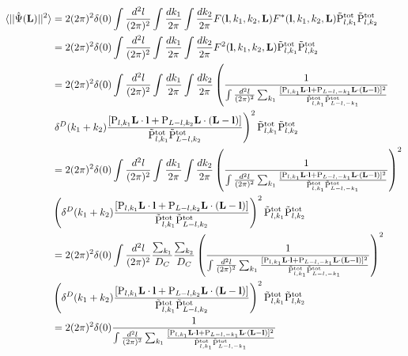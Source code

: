 \documentclass[12pt]{article}
\newcommand{\beq}{\begin{equation}}
\newcommand{\eeq}{\end{equation}}
\newcommand{\beqal}{\begin{aligned}}
\newcommand{\eeqal}{\end{aligned}}
\def\l{{\bf l}}
\def\L{{\bf L}}
\def\pul{{\rm P}}
\def\ptot{{\tilde{\rm P}^{\rm tot}}}
\def\d2l{\frac{d^2l}{(2\pi)^2}}
\def\dko{\frac{dk_1}{2\pi}}
\def\dkt{\frac{dk_2}{2\pi}}
\numberwithin{equation}{section}
\begin{document}
\beq
\beqal
\langle ||\hat{\Psi}(\L)||^2\rangle &= 2 (2\pi)^2 \delta(0) \int \d2l \int \dko \int
\dkt F(\l,k_1,k_2,\L) F^*(\l,k_1,k_2,\L) \ptot_{l,k_1}\ptot_{l,k_2} 
\\
&= 2 (2\pi)^2 \delta(0) \int \d2l \int \dko \int
\dkt F^2(\l,k_1,k_2,\L)\ptot_{l,k_1}\ptot_{l,k_2} 
\\
&= 2 (2\pi)^2 \delta(0)  \int \d2l \int \dko \int \dkt \left( \frac{1}{\int \frac{d^2 l}{(2\pi)^2} \sum_{k_1} \frac{[\pul_{l,k_1} \L\cdot \l +
		\pul_{L-l,-k_1} \L\cdot (\L-\l)]^2}{\ptot_{l,k_1}\ptot_{L-l,-k_1}} }   \right.
\\
& \left.	\delta^D(k_1+k_2) \frac{[\pul_{l,k_1} \L\cdot \l +
	\pul_{L-l,k_2} \L\cdot (\L-\l)]}{\ptot_{l,k_1}\ptot_{L-l,k_2}} \right)^2 \ptot_{l,k_1}\ptot_{l,k_2} 
\\
&=  2 (2\pi)^2\delta(0) \int \d2l \int \dko \int \dkt \left( \frac{1}{\int \frac{d^2 l}{(2\pi)^2} \sum_{k_1} \frac{[\pul_{l,k_1} \L\cdot \l +
		\pul_{L-l,-k_1} \L\cdot (\L-\l)]^2}{\ptot_{l,k_1}\ptot_{L-l,-k_1}} } \right)^2
\\
& \left(	\delta^D(k_1+k_2) \frac{[\pul_{l,k_1} \L\cdot \l +
	\pul_{L-l,k_2} \L\cdot (\L-\l)]}{\ptot_{l,k_1}\ptot_{L-l,k_2}} \right)^2 \ptot_{l,k_1}\ptot_{l,k_2} 
\\
&=  2 (2\pi)^2\delta(0) \int \d2l \frac{\sum_{k_1}}{D_C} \frac{\sum_{k_2}}{D_C} \left( \frac{1}{\int \frac{d^2 l}{(2\pi)^2} \sum_{k_1} \frac{[\pul_{l,k_1} \L\cdot \l +
		\pul_{L-l,-k_1} \L\cdot (\L-\l)]^2}{\ptot_{l,k_1}\ptot_{L-l,-k_1}} } \right)^2
\\
& \left(	\delta^D(k_1+k_2) \frac{[\pul_{l,k_1} \L\cdot \l +
	\pul_{L-l,k_2} \L\cdot (\L-\l)]}{\ptot_{l,k_1}\ptot_{L-l,k_2}} \right)^2 \ptot_{l,k_1}\ptot_{l,k_2} 
\\
	&=  2 (2\pi)^2\delta(0) \frac{1}{\int \frac{d^2 l}{(2\pi)^2} \sum_{k_1} \frac{[\pul_{l,k_1} \L\cdot \l +
		\pul_{L-l,-k_1} \L\cdot (\L-\l)]^2}{\ptot_{l,k_1}\ptot_{L-l,-k_1}} } 
\eeqal
\eeq
%
%
%
\end{document}
